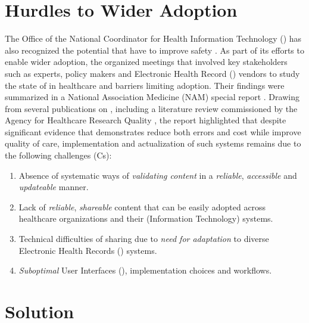 \section{Hurdles to Wider \CDSS{} Adoption}\label{sec:hurdles-cdss-adoption}

The Office of the National Coordinator for Health Information Technology
(\ONC{}) \cite{ONCUrl} has also recognized the potential that \CDSS{} have to
improve safety \cite{ONCCDSUrl}. As part of its efforts to enable wider
\CDSS{} adoption, the \ONC{} organized meetings that involved key stakeholders
such as \CDSS{} experts, policy makers and Electronic Health
Record (\EHR{}) vendors to study the state of \CDSS{} in healthcare and barriers
limiting adoption. Their findings were summarized in a National Association Medicine (NAM) special
report \cite{Nam17}. Drawing from several publications on \CDSSs{}, including a
literature review commissioned by the Agency for Healthcare Research Quality \cite{BrightAIM12},
the report highlighted that despite significant evidence that demonstrates
\CDSSs{} reduce both errors and cost while improve quality of care,
implementation and actualization of such systems remains  due to
the following challenges (Cs):

\begin{enumerate}[label=C\arabic*.]
\itemsep0.0em
\item Absence of systematic ways of \emph{validating content}
in a \emph{reliable}, \emph{accessible} and \emph{updateable} manner.
\item Lack of \emph{reliable}, \emph{shareable} \CDSS{} content
that can be easily adopted across healthcare organizations and their (Information
Technology) \IT{} systems.
\item Technical difficulties of sharing due to \emph{need for
  adaptation} to diverse Electronic Health Records (\EHR) systems.
\item \emph{Suboptimal} User Interfaces (\UIs), implementation choices and
workflows.
\end{enumerate}

\section{Solution}

